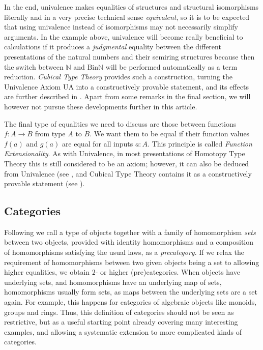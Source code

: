 \documentclass{amsart}
\theoremstyle{plain}
\numberwithin{equation}{section} %
\numberwithin{figure}{section} %
\theoremstyle{plain}
\theoremstyle{plain}
\theoremstyle{plain}
\theoremstyle{plain}
\theoremstyle{plain}
\theoremstyle{plain}
\theoremstyle{remark}
\theoremstyle{remark}
\theoremstyle{remark}
\begin{document}

In the end, univalence makes equalities of structures and structural isomorphisms literally and in a very precise technical sense \textit{equivalent}, so it is to be expected that using univalence instead of isomorphisms may not necessarily simplify arguments. In the example above, univalence will become really beneficial to calculations if it produces a \textit{judgmental} equality between the different presentations of the natural numbers and their semiring structures because then the switch between $\mathbb{N}$ and $\mathrm{Bin}\mathbb{N}$ will be performed automatically as a term reduction. \textit{Cubical Type Theory} provides such a construction, turning the Univalence Axiom $\mathrm{UA}$ into a constructively provable statement, and its effects are further described in \cite{VMA21}. Apart from some remarks in the final section, we will however not pursue these developments further in this article.

The final type of equalities we need to discuss are those between functions $f : A \rightarrow B$ from type $A$ to $B$. We want them to be equal if their function values $f(a)$ and $g(a)$ are equal for all inputs $a : A$. This principle is called \textit{Function Extensionality}. As with Univalence, in most presentations of Homotopy Type Theory this is still considered to be an axiom; however, it can also be deduced from Univalence (see \cite[4.9]{HoTTBook}, and Cubical Type Theory contains it as a constructively provable statement (see \cite{CCHM18}). 

\subsection{Categories} \label{cat-ssec}

Following \cite[Ch.~9]{HoTTBook} we call a type of objects together with a family of homomorphism \textit{sets} between two objects, provided with identity homomorphisms and a composition of homomorphisms satisfying the usual laws, as a \textit{precategory}. If we relax the requirement of homomorphisms between two given objects being a set to allowing higher equalities, we obtain $2$- or higher (pre)categories. When objects have underlying sets, and homomorphisms have an underlying map of sets, homomorphisms usually form sets, as maps between the underlying sets are a set again. For example, this happens for categories of algebraic objects like monoids, groups and rings. Thus, this definition of categories should not be seen as restrictive, but as a useful starting point already covering many interesting examples, and allowing a systematic extension to more complicated kinds of categories.
\end{document}
